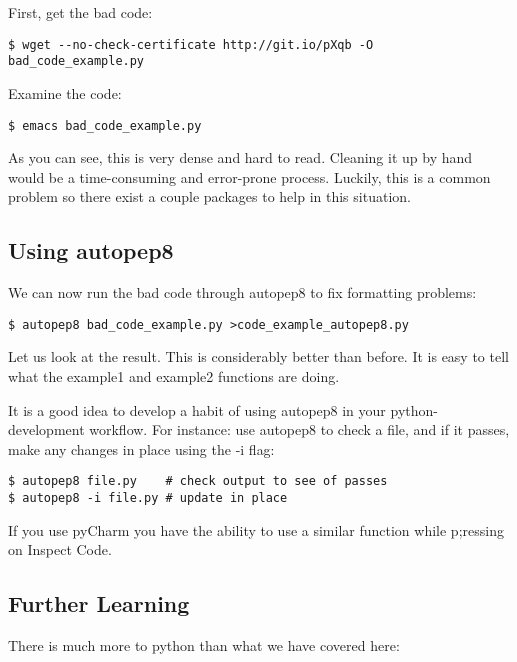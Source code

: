 First, get the bad code:

\begin{verbatim}
$ wget --no-check-certificate http://git.io/pXqb -O bad_code_example.py
\end{verbatim}

Examine the code:

\begin{verbatim}
$ emacs bad_code_example.py
\end{verbatim}

As you can see, this is very dense and hard to read. Cleaning it up by
hand would be a time-consuming and error-prone process. Luckily, this is
a common problem so there exist a couple packages to help in this
situation.

\subsection{Using autopep8}\label{using-autopep8}

We can now run the bad code through autopep8 to fix formatting problems:

\begin{verbatim}
$ autopep8 bad_code_example.py >code_example_autopep8.py
\end{verbatim}

Let us look at the result. This is considerably better than before. It
is easy to tell what the example1 and example2 functions are doing.

It is a good idea to develop a habit of using autopep8 in your
python-development workflow. For instance: use autopep8 to check a file,
and if it passes, make any changes in place using the -i flag:

\begin{verbatim}
$ autopep8 file.py    # check output to see of passes
$ autopep8 -i file.py # update in place
\end{verbatim}

If you use pyCharm you have the ability to use a similar function while
p;ressing on Inspect Code.

\subsection{Further Learning}\label{further-learning}

There is much more to python than what we have covered here:

